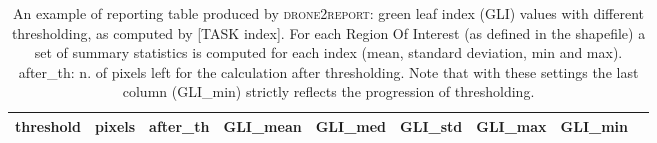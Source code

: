 \documentclass[drones,technicalnote,accept,pdftex,moreauthors]{Definitions/mdpi}
\begin{document}
\begin{table}[H]
\small
\caption{An example of reporting table produced by \textsc{drone2report}: green leaf index (GLI) values with different thresholding, as computed by [TASK index]. For each Region Of Interest (as defined in the shapefile) a set of summary statistics is computed for each index (mean, standard deviation, min and max). after\_th: n. of pixels left for the calculation after thresholding. Note that with these settings the last column (GLI\_min) strictly reflects the progression of thresholding.}
\label{tab:index-thresholds}
\begin{tabular}{lllllllll}

\hline
\textbf{threshold}    & \textbf{pixels} & \textbf{after\_th} & \textbf{GLI\_mean} & \textbf{GLI\_med} & \textbf{GLI\_std} & \textbf{GLI\_max} & \textbf{GLI\_min} \\
\hline


\end{tabular}
\end{table}
\end{document}

